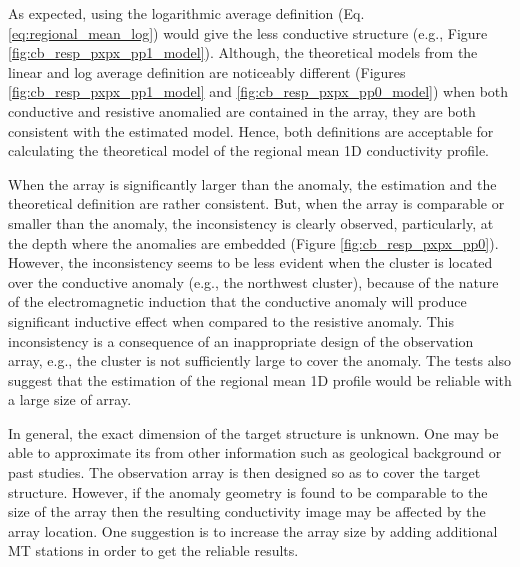 
	 As expected, using the logarithmic average definition (Eq. \ref{eq:regional_mean_log}) would give the less conductive structure (e.g., Figure \ref{fig:cb_resp_pxpx_pp1_model}). 
	 Although, the theoretical models from the linear and log average definition are noticeably different (Figures \ref{fig:cb_resp_pxpx_pp1_model} and \ref{fig:cb_resp_pxpx_pp0_model}) when both conductive and resistive anomalied are contained in the array, they are both consistent with the estimated model. 
	Hence, both definitions are acceptable for calculating the theoretical model of the regional mean 1D conductivity profile.

 
	When the array is significantly larger than the anomaly, the estimation and the theoretical definition are rather consistent.
	But, when the array is comparable or smaller than the anomaly, the inconsistency is clearly observed, particularly, at the depth where the anomalies are embedded (Figure \ref{fig:cb_resp_pxpx_pp0}). 
	However, the inconsistency seems to be less evident when the cluster is located over the conductive anomaly (e.g., the northwest cluster), because of the nature of the electromagnetic induction that the conductive anomaly will produce significant inductive effect when compared to the resistive anomaly.
	This inconsistency is a consequence of an inappropriate design of the observation array, e.g., the cluster is not sufficiently large to cover the anomaly. The tests also suggest that the estimation of the regional mean 1D profile would be reliable with a large size of array.


	In general, the exact dimension of the target structure is unknown. One may be able to approximate its from other information such as geological background or past studies.
	The observation array is then designed so as to cover the target structure.
	However, if the anomaly geometry is found to be comparable to the size of the array then the resulting conductivity image may be affected by the array location. One suggestion is to increase the array size by adding additional MT stations in order to get the reliable results.

